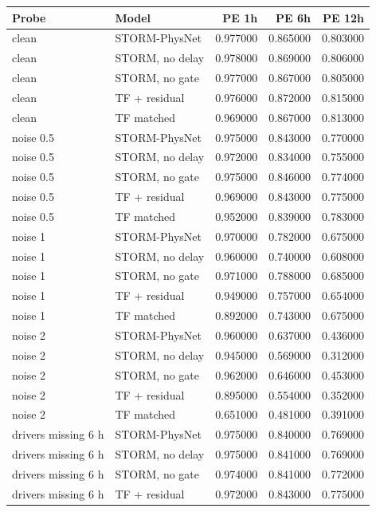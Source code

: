 \begin{tabular}{llrrr}
\toprule
Probe & Model & PE 1h & PE 6h & PE 12h \\
\midrule
clean & STORM-PhysNet & 0.977000 & 0.865000 & 0.803000 \\
clean & STORM, no delay & 0.978000 & 0.869000 & 0.806000 \\
clean & STORM, no gate & 0.977000 & 0.867000 & 0.805000 \\
clean & TF + residual & 0.976000 & 0.872000 & 0.815000 \\
clean & TF matched & 0.969000 & 0.867000 & 0.813000 \\
noise 0.5 & STORM-PhysNet & 0.975000 & 0.843000 & 0.770000 \\
noise 0.5 & STORM, no delay & 0.972000 & 0.834000 & 0.755000 \\
noise 0.5 & STORM, no gate & 0.975000 & 0.846000 & 0.774000 \\
noise 0.5 & TF + residual & 0.969000 & 0.843000 & 0.775000 \\
noise 0.5 & TF matched & 0.952000 & 0.839000 & 0.783000 \\
noise 1 & STORM-PhysNet & 0.970000 & 0.782000 & 0.675000 \\
noise 1 & STORM, no delay & 0.960000 & 0.740000 & 0.608000 \\
noise 1 & STORM, no gate & 0.971000 & 0.788000 & 0.685000 \\
noise 1 & TF + residual & 0.949000 & 0.757000 & 0.654000 \\
noise 1 & TF matched & 0.892000 & 0.743000 & 0.675000 \\
noise 2 & STORM-PhysNet & 0.960000 & 0.637000 & 0.436000 \\
noise 2 & STORM, no delay & 0.945000 & 0.569000 & 0.312000 \\
noise 2 & STORM, no gate & 0.962000 & 0.646000 & 0.453000 \\
noise 2 & TF + residual & 0.895000 & 0.554000 & 0.352000 \\
noise 2 & TF matched & 0.651000 & 0.481000 & 0.391000 \\
drivers missing 6 h & STORM-PhysNet & 0.975000 & 0.840000 & 0.769000 \\
drivers missing 6 h & STORM, no delay & 0.975000 & 0.841000 & 0.769000 \\
drivers missing 6 h & STORM, no gate & 0.974000 & 0.841000 & 0.772000 \\
drivers missing 6 h & TF + residual & 0.972000 & 0.843000 & 0.775000 \\

\end{tabular}
